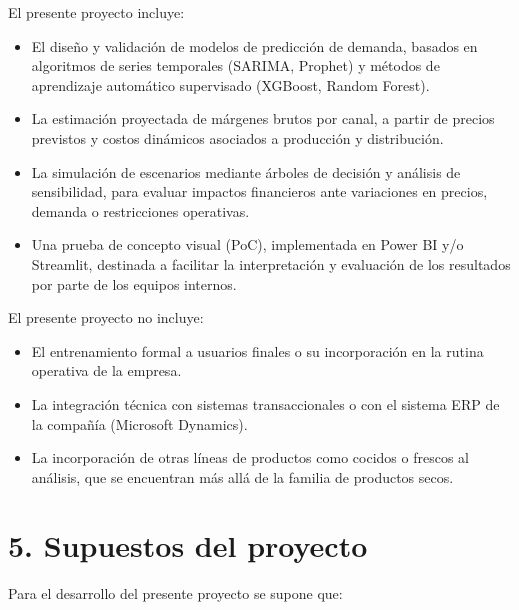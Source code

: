 \documentclass[
11pt, %
]{charter}
\begin{document}
El presente proyecto incluye:
\begin{itemize}
	\item El diseño y validación de modelos de predicción de demanda, basados en algoritmos de series temporales (SARIMA, Prophet) y métodos de aprendizaje automático supervisado (XGBoost, Random Forest).
	\item La estimación proyectada de márgenes brutos por canal, a partir de precios previstos y costos dinámicos asociados a producción y distribución.
	\item La simulación de escenarios mediante árboles de decisión y análisis de sensibilidad, para evaluar impactos financieros ante variaciones en precios, demanda o restricciones operativas.
	\item Una prueba de concepto visual (PoC), implementada en Power BI y/o Streamlit, destinada a facilitar la interpretación y evaluación de los resultados por parte de los equipos internos.

\end{itemize}
\pagebreak

El presente proyecto no incluye:
\begin{itemize}
	\item El entrenamiento formal a usuarios finales o su incorporación en la rutina operativa de la empresa.
	\item La integración técnica con sistemas transaccionales o con el sistema ERP de la compañía (Microsoft Dynamics).
	\item La incorporación de otras líneas de productos como cocidos o frescos al análisis, que se encuentran más allá de la familia de productos secos.

\end{itemize}


\section{5. Supuestos del proyecto}
\label{sec:supuestos}

Para el desarrollo del presente proyecto se supone que:
\end{document}
